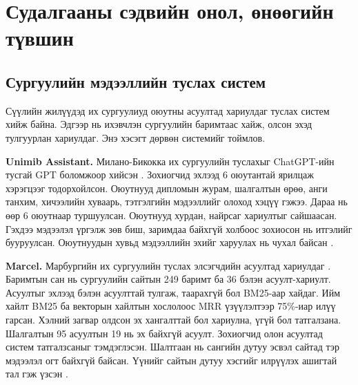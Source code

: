 \chapter{Судалгааны сэдвийн онол, өнөөгийн түвшин}
\label{ch:literature}


\section{Сургуулийн мэдээллийн туслах систем}
\label{sec:lit-campus}

Сүүлийн жилүүдэд их сургуулиуд оюутны асуултад хариулдаг туслах систем хийж байна. Эдгээр нь ихэвчлэн сургуулийн баримтаас хайж, олсон эхэд тулгуурлан хариулдаг. Энэ хэсэгт дөрвөн системийг тоймлов.

\textbf{Unimib Assistant.} Милано-Бикокка их сургуулийн туслахыг ChatGPT-ийн тусгай GPT боломжоор хийсэн \cite{antico2024unimib}. Зохиогчид эхлээд 6 оюутантай ярилцаж хэрэгцээг тодорхойлсон. Оюутнууд дипломын журам, шалгалтын өрөө, анги танхим, хичээлийн хуваарь, тэтгэлгийн мэдээллийг олоход хэцүү гэжээ. Дараа нь өөр 6 оюутнаар туршуулсан. Оюутнууд хурдан, найрсаг хариултыг сайшаасан. Гэхдээ мэдээлэл үргэлж зөв биш, заримдаа байхгүй холбоос зохиосон нь итгэлийг бууруулсан. Оюутнуудын хувьд мэдээллийн эхийг харуулах нь чухал байсан \cite{antico2024unimib}.

\textbf{Marcel.} Марбургийн их сургуулийн туслах элсэгчдийн асуултад хариулдаг \cite{trienes2025marcel}. Баримтын сан нь сургуулийн сайтын 249 баримт ба 36 бэлэн асуулт-хариулт. Асуултыг эхлээд бэлэн асуулттай тулгаж, таарахгүй бол BM25-аар хайдаг. Ийм хайлт BM25 ба векторын хайлтын хослолоос MRR үзүүлэлтээр 75\%-иар илүү гарсан. Хэлний загвар олдсон эх хангалттай бол хариулна, үгүй бол татгалзана. Шалгалтын 95 асуултын 19 нь эх байхгүй асуулт. Зохиогчид олон асуултад систем татгалзсаныг тэмдэглэсэн. Шалтгаан нь сангийн дутуу эсвэл сайтад тэр мэдээлэл огт байхгүй байсан. Үүнийг сайтын дутуу хэсгийг илрүүлэх ашигтай тал гэж үзсэн \cite{trienes2025marcel}.

